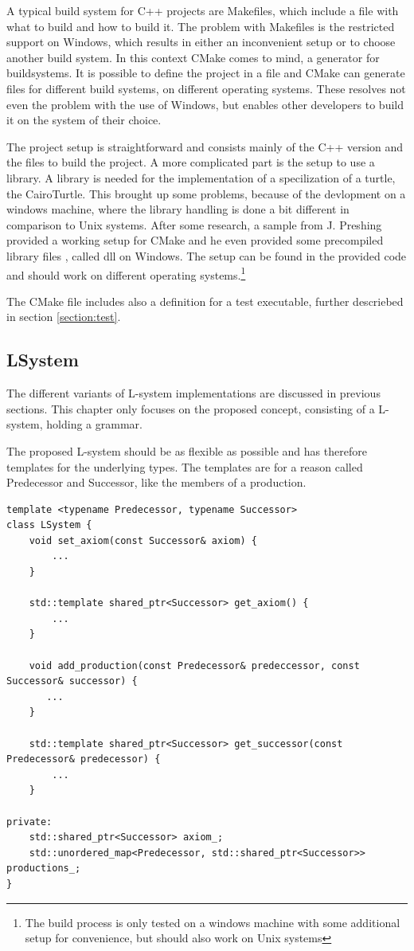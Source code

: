 \documentclass[english]{cpp-hmwk}
\begin{document}
A typical build system for C++ projects are Makefiles, which include a file with what to build and how to build it. The problem with Makefiles is the restricted support on Windows, which results in either an inconvenient setup or to choose another build system.
In this context CMake comes to mind, a generator for buildsystems. It is possible to define the project in a file and CMake can generate files for different build systems, on different operating systems. These resolves not even the problem with the use of Windows, but enables other developers to build it on the system of their choice.

The project setup is straightforward and consists mainly of the C++ version and the files to build the project. A more complicated part is the setup to use a library. A library is needed for the implementation of a specilization of a turtle, the CairoTurtle. This brought up some problems, because of the devlopment on a windows machine, where the library handling is done a bit different in comparison to Unix systems. After some research, a sample from J. Preshing \cite{cairoinclude} provided a working setup for CMake and he even provided some precompiled library files \cite{cairodll}, called dll on Windows. 
The setup can be found in the provided code and should work on different operating systems.\footnote{The build process is only tested on a windows machine with some additional setup for convenience, but should also work on Unix systems}

The CMake file includes also a definition for a test executable, further descriebed in section \ref{section:test}.

\subsection{LSystem}
\label{section:impl_l_system}
The different variants of L-system implementations are discussed in previous sections. This chapter only focuses on the proposed concept, consisting of a L-system, holding a grammar.

The proposed L-system should be as flexible as possible and has therefore templates for the underlying types. The templates are for a reason called Predecessor and Successor, like the members of a production.

\medskip
\begin{lstlisting}
template <typename Predecessor, typename Successor>
class LSystem {
    void set_axiom(const Successor& axiom) {
        ...
    }

    std::template shared_ptr<Successor> get_axiom() {
        ...
    }

    void add_production(const Predecessor& predeccessor, const Successor& successor) {
       ...
    }

    std::template shared_ptr<Successor> get_successor(const Predecessor& predecessor) {
        ...
    }
    
private:
    std::shared_ptr<Successor> axiom_;
    std::unordered_map<Predecessor, std::shared_ptr<Successor>> productions_;
}
\end{lstlisting}
\end{document}
